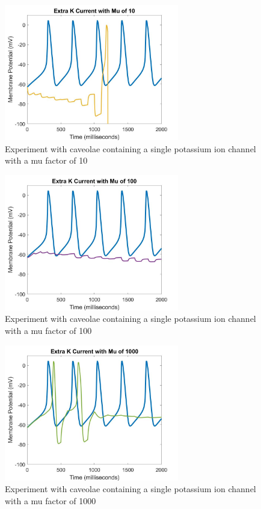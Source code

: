 \documentclass{bmcart}%
\begin{document}
\begin{figure}[ht]
  \centering
  \includegraphics[width=3in]{images/KMu10}
  \caption[KMu10]
  {Experiment with caveolae containing a single potassium ion channel\\
  with a mu factor of 10}
\label{fig:KMu10}
\end{figure}

\begin{figure}[ht]
  \centering
  \includegraphics[width=3in]{images/KMu100}
  \caption[KMu100]
  {Experiment with caveolae containing a single potassium ion channel\\
  with a mu factor of 100}
\label{fig:KMu100}
\end{figure}

\begin{figure}[ht]
  \centering
  \includegraphics[width=3in]{images/KMu1000}
  \caption[KMu1000]
  {Experiment with caveolae containing a single potassium ion channel\\
  with a mu factor of 1000}
\label{fig:KMu1000}
\end{figure}
\end{document}
